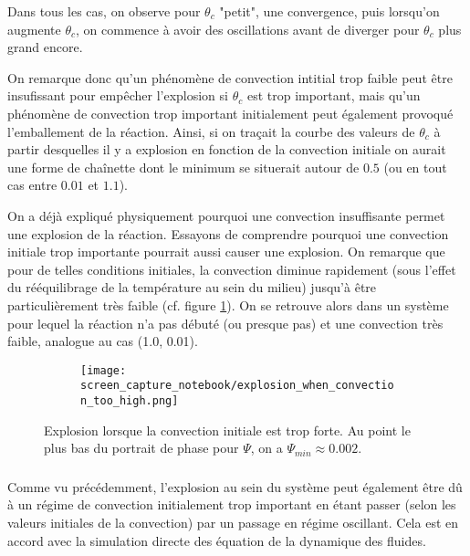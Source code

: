 \documentclass[10pt,a4paper]{report}
\begin{document}
Dans tous les cas, on observe pour $\theta_c$ "petit", une convergence, puis lorsqu'on augmente $\theta_c$, on commence à avoir des oscillations avant de diverger pour $\theta_c$ plus grand encore.

On remarque donc qu'un phénomène de convection intitial trop faible peut être insufissant pour empêcher l'explosion si $\theta_c$ est trop important, mais qu'un phénomène de convection trop important initialement peut également provoqué l'emballement de la réaction. Ainsi, si on traçait la courbe des valeurs de $\theta_c$ à partir desquelles il y a explosion en fonction de la convection initiale on aurait une forme de chaînette dont le minimum se situerait autour de $0.5$ (ou en tout cas entre $0.01$ et $1.1$).

On a déjà expliqué physiquement pourquoi une convection insuffisante permet une explosion de la réaction. Essayons de comprendre pourquoi une convection initiale trop importante pourrait aussi causer une explosion. On remarque que pour de telles conditions initiales, la convection diminue rapidement (sous l'effet du rééquilibrage de la température au sein du milieu) jusqu'à être particulièrement très faible (cf. figure \ref{fig:explosion_high_conv}). On se retrouve alors dans un système pour lequel la réaction n'a pas débuté (ou presque pas) et une convection très faible, analogue au cas (1.0, 0.01). 

\begin{figure}
		\centering
		\begin{subfigure}{}
        	\texttt{[image: screen\_capture\_notebook/explosion\_when\_convection\_too\_high.png]}
    	\end{subfigure}
		
   	\caption{Explosion lorsque la convection initiale est trop forte. Au point le plus bas du portrait de phase pour $\Psi$, on a $\Psi_{min} \approx 0.002$.}
    \label{fig:explosion_high_conv}
\end{figure}


\subsubsection{} %

Comme vu précédemment, l'explosion au sein du système peut également être dû à un régime de convection initialement trop important en étant passer (selon les valeurs initiales de la convection) par un passage en régime oscillant. Cela est en accord avec la simulation directe des équation de la dynamique des fluides.
\end{document}
